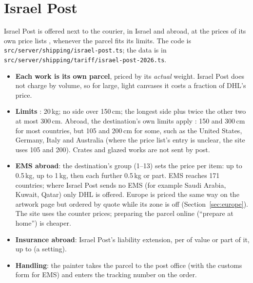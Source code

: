 \documentclass[11pt,a4paper]{article}
\newcommand{\nis}[1]{\text{NIS\,#1}}
\newcommand{\code}[1]{\nolinkurl{#1}}  %
\begin{document}
\section{Israel Post}\label{sec:post}
Israel Post is offered next to the courier, in Israel and abroad, at the prices of its own price
lists \cite{postdomestic,postems}, whenever the parcel fits its limits. The code is
\code{src/server/shipping/israel-post.ts}; the data is in
\code{src/server/shipping/tariff/israel-post-2026.ts}.
\begin{itemize}
  \item \textbf{Each work is its own parcel}, priced by its \emph{actual} weight. Israel Post
    does not charge by volume, so for large, light canvases it costs a fraction of DHL's price.
  \item \textbf{Limits} \cite{postguide}: 20\,kg; no side over 150\,cm; the longest side
    plus twice the other two at most 300\,cm. Abroad, the destination's own limits apply
    \cite{postems}: 150 and 300\,cm for most countries, but 105 and 200\,cm for some, such as
    the United States, Germany, Italy and Australia (where the price list's entry is unclear, the
    site uses 105 and 200). Crates and glazed works are not sent by post.
  \item \textbf{EMS abroad}: the destination's group (1--13) sets the price per item: up to
    0.5\,kg, up to 1\,kg, then each further 0.5\,kg or part. EMS reaches 171 countries; where
    Israel Post sends no EMS (for example Saudi Arabia, Kuwait, Qatar) only DHL is offered.
    Europe is priced the same way on the artwork page but ordered by quote while its zone is off
    (Section~\ref{sec:europe}). The site uses the counter prices; preparing
    the parcel online (``prepare at home'') is \nis{5} cheaper.
  \item \textbf{Insurance abroad}: Israel Post's liability extension, \nis{6.90} per
    \nis{1{,}000} of value or part of it, up to \nis{25{,}000} (a setting).
  \item \textbf{Handling}: the painter takes the parcel to the post office (with the customs
    form for EMS) and enters the tracking number on the order.
\end{itemize}
\end{document}
